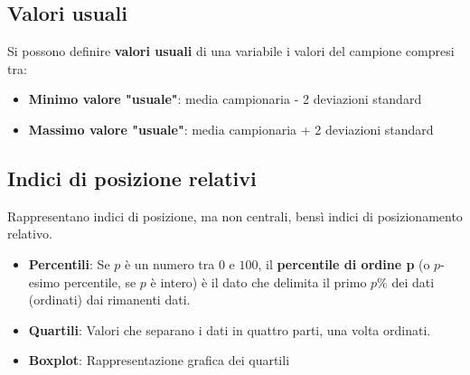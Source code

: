\documentclass[a4paper]{article}
\theoremstyle{break}
\theoremstyle{break}
\theoremstyle{break}
\theoremstyle{break}
\begin{document}
\subsection{Valori usuali}
Si possono definire \textbf{valori usuali} di una variabile i valori del campione compresi
tra:
\begin{itemize}
	\item \textbf{Minimo valore "usuale"}: media campionaria - 2 deviazioni standard
	\item \textbf{Massimo valore "usuale"}: media campionaria + 2 deviazioni standard
\end{itemize}

\subsection{Indici di posizione relativi}
Rappresentano indici di posizione, ma non centrali, bensì indici di posizionamento relativo.
\begin{itemize}
	\item \textbf{Percentili}: Se \( p \) è un numero tra \( 0 \) e \( 100 \), il \textbf{percentile
		      di ordine p} (o \( p \)-esimo percentile, se \( p \) è intero) è il dato che delimita il primo
	      \( p\% \) dei dati (ordinati) dai rimanenti dati.
	      \begin{figure}[H]
		      \centering
	      \end{figure}
	\item \textbf{Quartili}: Valori che separano i dati in quattro parti, una volta ordinati.
	\item \textbf{Boxplot}: Rappresentazione grafica dei quartili
\end{itemize}
\end{document}
